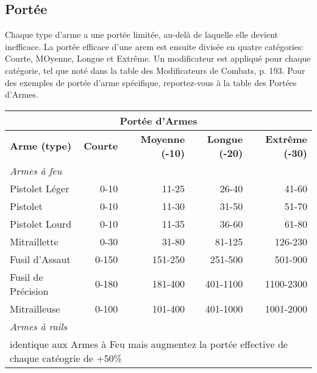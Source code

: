 \subsection{Portée} \label{sec:range} 

Chaque type d'arme a une portée limitée, au-delà de laquelle elle devient inefficace. La portée efficace d'une arem est ensuite divisée en quatre catégories: Courte, MOyenne, Longue et Extrême. Un modificateur est appliqué pour chaque catégorie, tel que noté dans la table des Modificateurs de Combats, p. 193. Pour des exemples de portée d'arme spécifique, reportez-vous à la table des Portées d'Armes. 

\begin{table} \begin{tabularx}{\textwidth}{|X|r|r|r|r|} \hline

\multicolumn{5}{|c|}{\textbf{Portée d'Armes}} \\ \hline

\textbf{Arme (type)} &\textbf{Courte} &\textbf{Moyenne (-10)} &\textbf{Longue (-20)} &\textbf{Extrême (-30)}\\ \hline

\multicolumn{5}{|l|}{\emph{Armes à feu}} \\ \hline

Pistolet Léger	&0-10	&11-25	&26-40	&41-60	\\ \hline

Pistolet	&0-10	&11-30	&31-50	&51-70	\\ \hline

Pistolet Lourd	&0-10	&11-35	&36-60	&61-80	\\ \hline

Mitraillette	&0-30	&31-80	&81-125	&126-230	\\ \hline

Fusil d'Assaut	&0-150	&151-250	&251-500	&501-900	\\ \hline

Fusil de Précision	&0-180	&181-400	&401-1100	&1100-2300	\\ \hline

Mitrailleuse	&0-100	&101-400	&401-1000	&1001-2000	\\ \hline

\multicolumn{5}{|l|}{\emph{Armes à rails}}\\ \hline

\multicolumn{5}{|l|}{identique aux Armes à Feu mais augmentez la portée effective de chaque catéogrie de +50\%} \\ \hline


\end{tabularx}
\end{table}
